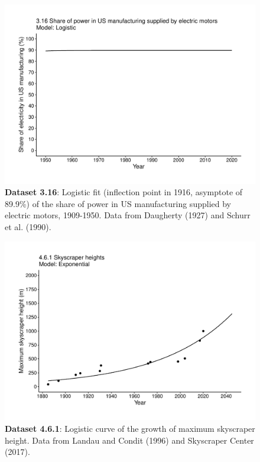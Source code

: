 \documentclass[aps,rmp,preprint,superscriptaddress,10pt,onecolumn]{article}
\begin{document}
\clearpage
\begin{figure}[h]
\includegraphics[width=\textwidth]{output/figs-ggplot/3.16.pdf}
\caption{\textbf{Dataset 3.16}: Logistic fit (inflection point in 1916, asymptote of 89.9\%) of the share of power in US manufacturing supplied by electric motors, 1909-1950. Data from Daugherty (1927) and Schurr et al. (1990).}
\end{figure}
	
\clearpage
\begin{figure}[h]
\includegraphics[width=\textwidth]{output/figs-ggplot/4.6.1.pdf}
\caption{\textbf{Dataset 4.6.1}: Logistic curve of the growth of maximum skyscraper height. Data from Landau and Condit (1996) and Skyscraper Center (2017).}
\end{figure}
	
\end{document}
